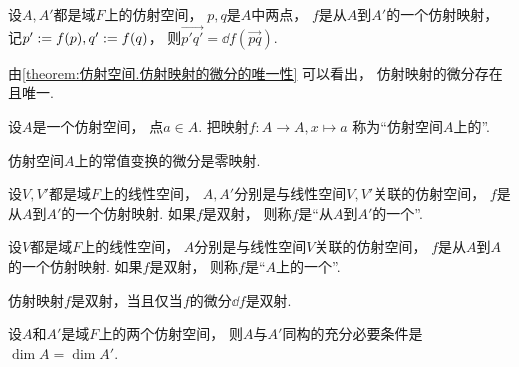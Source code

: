 \begin{proposition}\label{theorem:仿射空间.仿射映射的微分的唯一性}
设\(A,A'\)都是域\(F\)上的仿射空间，
\(p,q\)是\(A\)中两点，
\(f\)是从\(A\)到\(A'\)的一个仿射映射，
记\(p' := f(p), q' := f(q)\)，
则\(
	\vec{p'q'}
	= \dd{f}(\vec{pq})
\).
\end{proposition}
\begin{remark}
由\cref{theorem:仿射空间.仿射映射的微分的唯一性} 可以看出，
仿射映射的微分存在且唯一.
\end{remark}

\begin{definition}
设\(A\)是一个仿射空间，
点\(a \in A\).
把映射\(f\colon A \to A, x \mapsto a\)
称为“仿射空间\(A\)上的”.
\end{definition}

\begin{proposition}
仿射空间\(A\)上的常值变换的微分是零映射.
\end{proposition}

\begin{definition}
设\(V,V'\)都是域\(F\)上的线性空间，
\(A,A'\)分别是与线性空间\(V,V'\)关联的仿射空间，
\(f\)是从\(A\)到\(A'\)的一个仿射映射.
如果\(f\)是双射，
则称\(f\)是“从\(A\)到\(A'\)的一个”.
\end{definition}

\begin{definition}
设\(V\)都是域\(F\)上的线性空间，
\(A\)分别是与线性空间\(V\)关联的仿射空间，
\(f\)是从\(A\)到\(A\)的一个仿射映射.
如果\(f\)是双射，
则称\(f\)是“\(A\)上的一个”.
\end{definition}

\begin{proposition}
仿射映射\(f\)是双射，当且仅当\(f\)的微分\(\dd{f}\)是双射.
\end{proposition}

\begin{proposition}
设\(A\)和\(A'\)是域\(F\)上的两个仿射空间，
则\(A\)与\(A'\)同构的充分必要条件是\(\dim A = \dim A'\).
\end{proposition}

